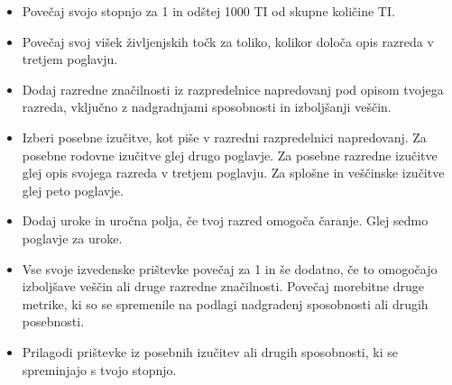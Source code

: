 \begin{itemize}
    \item Povečaj svojo stopnjo za 1 in odštej 1000 TI od skupne količine TI.
    \item Povečaj svoj višek življenjskih točk za toliko, kolikor določa opis razreda v tretjem poglavju.
    \item Dodaj razredne značilnosti iz razpredelnice napredovanj pod opisom tvojega razreda, vključno z nadgradnjami sposobnosti in izboljšanji veščin.
    \item Izberi posebne izučitve, kot piše v razredni razpredelnici napredovanj. Za posebne rodovne izučitve glej drugo poglavje. Za posebne razredne izučitve glej opis svojega razreda v tretjem poglavju. Za splošne in veščinske izučitve glej peto poglavje.
    \item Dodaj uroke in uročna polja, če tvoj razred omogoča čaranje. Glej sedmo poglavje za uroke.
    \item Vse svoje izvedenske prištevke povečaj za 1 in še dodatno, če to omogočajo izboljšave veščin ali druge razredne značilnosti. Povečaj morebitne druge metrike, ki so se spremenile na podlagi nadgradenj sposobnosti ali drugih posebnosti.
    \item Prilagodi prištevke iz posebnih izučitev ali drugih sposobnosti, ki se spreminjajo s tvojo stopnjo.
\end{itemize}